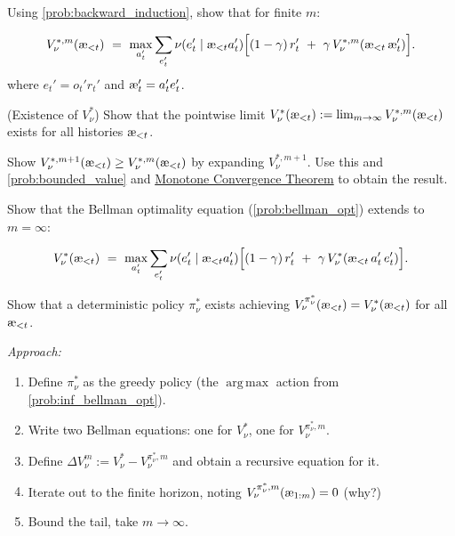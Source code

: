 \documentclass[fontsize=11pt, parskip=half]{scrartcl}
\newcommand{\cA}{\mathcal{A}}
\newcommand{\cE}{\mathcal{E}}
\DeclareMathOperator*{\argmax}{arg\,max}
\newcommand{\aes}{\textnormal{\ae}}
\begin{document}
\begin{exercise}
\label{prob:bellman_opt}
Using \cref{prob:backward_induction}, show that for finite $m$:

\[
    V_\nu^{*,m}(\aes_{<t}) ~=~ \max_{a'_t} \sum_{e'_t} \nu(e'_t \mid \aes_{<t} a'_t) \Big[(1-\gamma)\, r'_t ~+~ \gamma\, V_\nu^{*,m}(\aes_{<t}\, \aes'_t)\Big].
\]
where $e_t' = o_t' r_t'$ and $\aes'_t = a'_t e'_t$.
\end{exercise}


\begin{exercise}
\label{prob:inf_horizon}
\skippable
(Existence of $V_\nu^*$)
Show that the pointwise limit $V_\nu^*(\aes_{<t}) := \lim_{m \to \infty} V_\nu^{*,m}(\aes_{<t})$ exists for all histories $\aes_{<t}$.


\begin{hint}
Show $V_\nu^{*,m+1}(\aes_{<t}) \geq V_\nu^{*,m}(\aes_{<t})$ by expanding $V_\nu^{*,m+1}$. Use this and \cref{prob:bounded_value}
and \href{https://en.wikipedia.org/wiki/Monotone_convergence_theorem}{Monotone Convergence Theorem} to obtain the result.
\end{hint}
\end{exercise}


\begin{exercise}
\label{prob:inf_bellman_opt}
Show that the Bellman optimality equation (\cref{prob:bellman_opt}) extends to $m = \infty$:

\[
    V_\nu^*(\aes_{<t}) ~=~ \max_{a'_t} \sum_{e'_t} \nu(e'_t \mid \aes_{<t} a'_t) \Big[(1-\gamma)\, r'_t ~+~ \gamma\, V_\nu^*(\aes_{<t}\, a'_t\, e'_t)\Big].
\]

\end{exercise}


\begin{exercise}
\label{prob:inf_opt_policy}
\skippable
Show that a deterministic policy $\pi_\nu^*$ exists achieving $V_\nu^{\pi_\nu^*}(\aes_{<t}) = V_\nu^*(\aes_{<t})$ for all $\aes_{<t}$.


\textit{Approach:}
\begin{enumerate}\itemsep=2pt
    \item Define $\pi_\nu^*$ as the greedy policy (the $\argmax$ action from \cref{prob:inf_bellman_opt}).
    \item Write two Bellman equations: one for $V_\nu^*$, one for $V_\nu^{\pi_\nu^*, m}$.
    \item Define $\Delta V_\nu^m := V_\nu^* - V_\nu^{\pi_\nu^*, m}$ and obtain a recursive equation for it.
    \item Iterate out to the finite horizon, noting $V_\nu^{\pi_\nu^*, m}(\aes_{1:m}) = 0$ (why?)
    \item Bound the tail, take $m \to \infty$.
\end{enumerate}
\end{exercise}
\end{document}
